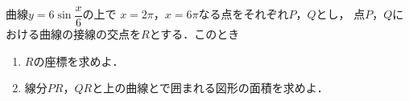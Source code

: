 \documentclass[../../main.tex]{subfiles}
\begin{document}
曲線$\displaystyle y=6\sin\dfrac{x}{6}$の上で
$x=2\pi$，$x=6\pi$なる点をそれぞれ$P$，$Q$とし，
点$P$，$Q$における曲線の接線の交点を$R$とする．このとき
\begin{enumerate}
  \item $R$の座標を求めよ．
  \item 線分$PR$，$QR$と上の曲線とで囲まれる図形の面積を求めよ．
\end{enumerate}
\end{document}
